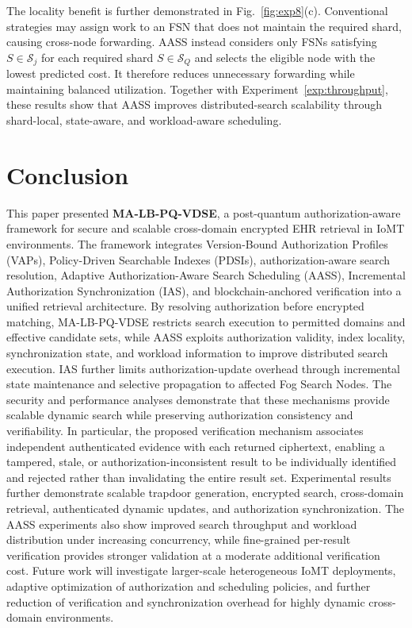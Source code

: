 \documentclass{ieeetj}
\theoremstyle{ieee-style}
\begin{document}
The locality benefit is further demonstrated in
Fig.~\ref{fig:exp8}(c). Conventional strategies may assign work to an
FSN that does not maintain the required shard, causing cross-node
forwarding. AASS instead considers only FSNs satisfying
$S\in\mathcal{S}_j$ for each required shard $S\in\mathcal{S}_Q$ and
selects the eligible node with the lowest predicted cost. It therefore
reduces unnecessary forwarding while maintaining balanced utilization.
Together with Experiment~\ref{exp:throughput}, these results show that
AASS improves distributed-search scalability through shard-local,
state-aware, and workload-aware scheduling.

\section{Conclusion}
\label{sec:conclusion}

This paper presented \textbf{MA-LB-PQ-VDSE}, a post-quantum
authorization-aware framework for secure and scalable cross-domain
encrypted EHR retrieval in IoMT environments. The framework integrates
Version-Bound Authorization Profiles (VAPs), Policy-Driven Searchable
Indexes (PDSIs), authorization-aware search resolution, Adaptive
Authorization-Aware Search Scheduling (AASS), Incremental Authorization
Synchronization (IAS), and blockchain-anchored verification into a
unified retrieval architecture. By resolving authorization before
encrypted matching, MA-LB-PQ-VDSE restricts search execution to
permitted domains and effective candidate sets, while AASS exploits
authorization validity, index locality, synchronization state, and
workload information to improve distributed search execution. IAS
further limits authorization-update overhead through incremental state
maintenance and selective propagation to affected Fog Search Nodes. The security and performance analyses demonstrate that these mechanisms
provide scalable dynamic search while preserving authorization
consistency and verifiability. In particular, the proposed verification
mechanism associates independent authenticated evidence with each
returned ciphertext, enabling a tampered, stale, or authorization-inconsistent result to be individually identified and
rejected rather than invalidating the entire result set. Experimental
results further demonstrate scalable trapdoor generation, encrypted
search, cross-domain retrieval, authenticated dynamic updates, and
authorization synchronization. The AASS experiments also show improved
search throughput and workload distribution under increasing
concurrency, while fine-grained per-result verification provides
stronger validation at a moderate additional verification cost. Future work will investigate
larger-scale heterogeneous IoMT deployments, adaptive optimization of
authorization and scheduling policies, and further reduction of
verification and synchronization overhead for highly dynamic
cross-domain environments.
\end{document}
